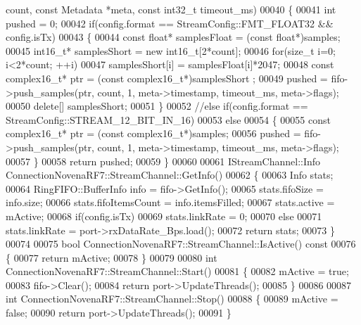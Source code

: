 \begin{DoxyCode}
      count, \textcolor{keyword}{const} Metadata *meta, \textcolor{keyword}{const} int32\_t timeout_ms)
00040 \{
00041     \textcolor{keywordtype}{int} pushed = 0;
00042     \textcolor{keywordflow}{if}(config.format == StreamConfig::FMT_FLOAT32 && config.isTx)
00043     \{
00044         \textcolor{keyword}{const} \textcolor{keywordtype}{float}* samplesFloat = (\textcolor{keyword}{const} \textcolor{keywordtype}{float}*)samples;
00045         int16\_t* samplesShort = \textcolor{keyword}{new} int16\_t[2*count];
00046         \textcolor{keywordflow}{for}(\textcolor{keywordtype}{size\_t} i=0; i<2*count; ++i)
00047             samplesShort[i] = samplesFloat[i]*2047;
00048         \textcolor{keyword}{const} complex16_t* ptr = (\textcolor{keyword}{const} complex16_t*)samplesShort ;
00049         pushed = fifo->push_samples(ptr, count, 1, meta->timestamp, timeout\_ms, meta->flags);
00050         \textcolor{keyword}{delete}[] samplesShort;
00051     \}
00052     \textcolor{comment}{//else if(config.format == StreamConfig::STREAM\_12\_BIT\_IN\_16)}
00053     \textcolor{keywordflow}{else}
00054     \{
00055         \textcolor{keyword}{const} complex16_t* ptr = (\textcolor{keyword}{const} complex16_t*)samples;
00056         pushed = fifo->push_samples(ptr, count, 1, meta->timestamp, timeout\_ms, meta->flags);
00057     \}
00058     \textcolor{keywordflow}{return} pushed;
00059 \}
00060 
00061 IStreamChannel::Info ConnectionNovenaRF7::StreamChannel::GetInfo()
00062 \{
00063     Info stats;
00064     RingFIFO::BufferInfo info = fifo->GetInfo();
00065     stats.fifoSize = info.size;
00066     stats.fifoItemsCount = info.itemsFilled;
00067     stats.active = mActive;
00068     \textcolor{keywordflow}{if}(config.isTx)
00069         stats.linkRate = 0;
00070     \textcolor{keywordflow}{else}
00071         stats.linkRate = port->rxDataRate_Bps.load();
00072     \textcolor{keywordflow}{return} stats;
00073 \}
00074 
00075 \textcolor{keywordtype}{bool} ConnectionNovenaRF7::StreamChannel::IsActive()\textcolor{keyword}{ const}
00076 \textcolor{keyword}{}\{
00077     \textcolor{keywordflow}{return} mActive;
00078 \}
00079 
00080 \textcolor{keywordtype}{int} ConnectionNovenaRF7::StreamChannel::Start()
00081 \{
00082     mActive = \textcolor{keyword}{true};
00083     fifo->Clear();
00084     \textcolor{keywordflow}{return} port->UpdateThreads();
00085 \}
00086 
00087 \textcolor{keywordtype}{int} ConnectionNovenaRF7::StreamChannel::Stop()
00088 \{
00089     mActive = \textcolor{keyword}{false};
00090     \textcolor{keywordflow}{return} port->UpdateThreads();
00091 \}
\end{DoxyCode}
